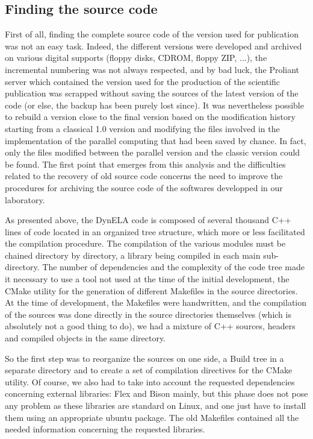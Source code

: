 \documentclass{article}
\begin{document}
\subsection{Finding the source code}

First of all, finding the complete source code of the version used for publication was not an easy task. Indeed, the different versions were developed and archived on various digital supports (floppy disks, CDROM, floppy ZIP, ...), the incremental numbering was not always respected, and by bad luck, the Proliant server which contained the version used for the production of the scientific publication was scrapped without saving the sources of the latest version of the code (or else, the backup has been purely lost since). It was nevertheless possible to rebuild a version close to the final version based on the modification history starting from a classical 1.0 version and modifying the files involved in the implementation of the parallel computing that had been saved by chance. In fact, only the files modified between the parallel version and the classic version could be found. The first point that emerges from this analysis and the difficulties related to the recovery of old source code concerns the need to improve the procedures for archiving the source code of the softwares developped in our laboratory.

As presented above, the DynELA code is composed of several thousand C++ lines of code located in an organized tree structure, which more or less facilitated the compilation procedure. The compilation of the various modules must be chained directory by directory, a library being compiled in each main sub-directory. The number of dependencies and the complexity of the code tree made it necessary to use a tool not used at the time of the initial development, the CMake \cite{CMake} utility for the generation of different Makefiles in the source directories. At the time of development, the Makefiles were handwritten, and the compilation of the sources was done directly in the source directories themselves (which is absolutely not a good thing to do), we had a mixture of C++ sources, headers and compiled objects in the same directory.

So the first step was to reorganize the sources on one side, a Build tree in a separate directory and to create a set of compilation directives for the CMake utility. Of course, we also had to take into account the requested dependencies concerning external libraries: Flex and Bison \cite{Levine:2009} mainly, but this phase does not pose any problem as these libraries are standard on Linux, and one just have to install them using an appropriate ubuntu package. The old Makefiles contained all the needed information concerning the requested libraries.
\end{document}
